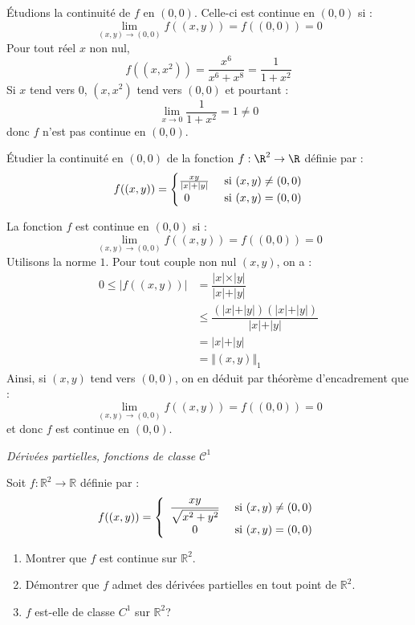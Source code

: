 \documentclass[a4paper,10pt]{report}
\begin{document}
\medskip

\noindent Étudions la continuité de $f$ en $(0,0)$. Celle-ci est continue en $(0,0)$ si :
$$ \lim_{(x,y) \rightarrow (0,0)} f((x,y)) =f((0,0))= 0$$
Pour tout réel $x$ non nul,
$$ f((x,x^2)) = \dfrac{x^6}{x^6+x^8} = \dfrac{1}{1+x^2}$$
Si $x$ tend vers $0$, $(x,x^2)$ tend vers $(0,0)$ et pourtant :
$$ \lim_{x \rightarrow 0} \dfrac{1}{1+x^2} = 1 \neq 0$$
donc $f$ n'est pas continue en $(0,0)$.

\begin{Exercice}{} Étudier la continuité en $(0,0)$ de la fonction $f : \R^{2} \rightarrow \R$ définie par :
  \[
  f((x,y)) =
  \begin{cases}
    \frac{xy}{\vert x \vert + \vert y \vert} & \hbox{ si } (x,y) \neq (0,0) \\
    \, \; 0 & \hbox{ si } (x,y)=(0,0)
  \end{cases}
  \]
\end{Exercice}

\corr La fonction $f$ est continue en $(0,0)$ si :
$$ \lim_{(x,y) \rightarrow (0,0)} f((x,y)) =f((0,0))= 0$$
Utilisons la norme $1$. Pour tout couple non nul $(x,y)$, on a :
\begin{align*}
0 \leq \vert f((x,y)) \vert & = \dfrac{\vert x \vert \times \vert y \vert}{\vert x \vert + \vert y \vert} \\
& \leq \dfrac{(\vert x \vert + \vert y \vert)(\vert x \vert + \vert y \vert)}{\vert x \vert + \vert y \vert} \\
& = \vert x \vert + \vert y \vert \\
& = \Vert (x,y) \Vert_1
\end{align*}
Ainsi, si $(x,y)$ tend vers $(0,0)$, on en déduit par théorème d'encadrement que :
$$  \lim_{(x,y) \rightarrow (0,0)} f((x,y)) =f((0,0))= 0$$
et donc $f$ est continue en $(0,0)$.

\medskip

\begin{center}
\textit{{ {\large Dérivées partielles, fonctions de classe $\mathcal{C}^1$}}}
\end{center}

\medskip

\begin{Exercice}{} Soit $f : \mathbb{R}^2 \rightarrow \mathbb{R}$ définie par :
$$ f((x,y)) = \left\lbrace \begin{array}{cl}
\dfrac{xy}{\sqrt{x^{2}+y^{2}}} & \hbox{ si } (x,y) \neq (0,0) \\
0 & \hbox{ si } (x,y) = (0,0)\\
\end{array}\right.$$

\begin{enumerate}
\item Montrer que $f$ est continue sur $\mathbb{R}^{2}$.
\item Démontrer que $f$ admet des d\'{e}riv\'{e}es partielles en tout point de $\mathbb{R}^{2}$.
\item $f$ est-elle de classe $C^{1}$ sur $\mathbb{R}^2$?
\end{enumerate}
\end{Exercice}
\end{document}
